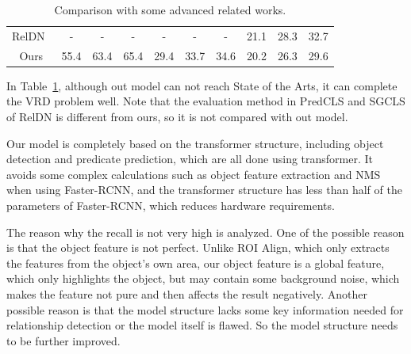 \begin{table}[!h]
{\begin{tabular}{c|ccc|ccc|ccc}
		RelDN~\cite{zhang2019graphical}                   & -                 & -                 & -                  & -                & -                 & -                 & 21.1                 & 28.3                 & 32.7                  \\
		Ours                   & 55.4       & 63.4       & 65.4        & 29.4      & 33.7      &34.6              & 20.2                    & 26.3                    & 29.6                     \\ \hline
	\end{tabular}}
\caption[Comparison with some advanced related works.]{Comparison with some advanced related works.}
\label{tab:compare_recall}
\end{table}

In Table~\ref{tab:compare_recall}, although out model can not reach State of the Arts, it can complete the VRD problem well. Note that the evaluation method in PredCLS and SGCLS of RelDN is different from ours, so it is not compared with out model.%

Our model is completely based on the transformer structure, including object detection and predicate prediction, which are all done using transformer. It avoids some complex calculations such as object feature extraction and NMS when using Faster-RCNN,  and the transformer structure has less than half of the parameters of Faster-RCNN, which reduces hardware requirements.

The reason why the recall is not very high is analyzed. One of the possible reason is that the object feature is not perfect. Unlike ROI Align, which only extracts the features from the object's own area, our object feature is a global feature, which only highlights the object, but may contain some background noise, which makes the feature not pure and then affects the result negatively. Another possible reason is that the model structure lacks some key information needed for relationship detection or the model itself is flawed. So the model structure needs to be further improved.

